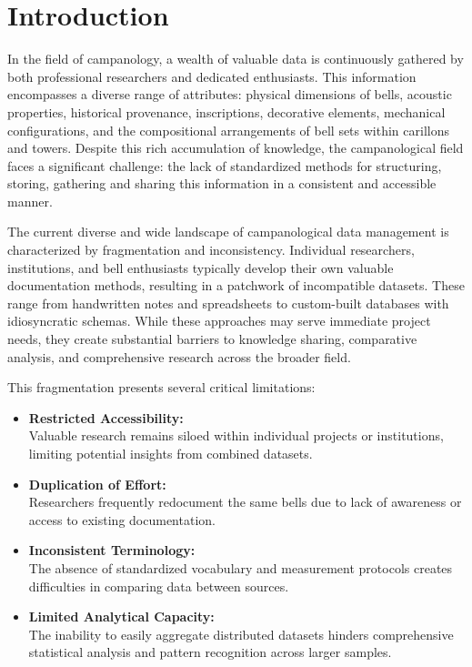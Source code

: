 \documentclass[11pt, a4paper]{article}
\begin{document}
\section{Introduction}

In the field of campanology, a wealth of valuable data is continuously gathered by both professional researchers and dedicated enthusiasts. This information encompasses a diverse range of attributes: physical dimensions of bells, acoustic properties, historical provenance, inscriptions, decorative elements, mechanical configurations, and the compositional arrangements of bell sets within carillons and towers. Despite this rich accumulation of knowledge, the campanological field faces a significant challenge: the lack of standardized methods for structuring, storing, gathering and sharing this information in a consistent and accessible manner.

The current diverse and wide landscape of campanological data management is characterized by fragmentation and inconsistency. Individual researchers, institutions, and bell enthusiasts typically develop their own valuable documentation methods, resulting in a patchwork of incompatible datasets. These range from handwritten notes and spreadsheets to custom-built databases with idiosyncratic schemas. While these approaches may serve immediate project needs, they create substantial barriers to knowledge sharing, comparative analysis, and comprehensive research across the broader field.

This fragmentation presents several critical limitations:

\begin{itemize}
    \item \textbf{Restricted Accessibility:} \\
        Valuable research remains siloed within individual projects or institutions, limiting potential insights from combined datasets.
    \item \textbf{Duplication of Effort:} \\
        Researchers frequently redocument the same bells due to lack of awareness or access to existing documentation.
    \item \textbf{Inconsistent Terminology:} \\
        The absence of standardized vocabulary and measurement protocols creates difficulties in comparing data between sources.
    \item \textbf{Limited Analytical Capacity:} \\
        The inability to easily aggregate distributed datasets hinders comprehensive statistical analysis and pattern recognition across larger samples.
\end{itemize}
\end{document}

